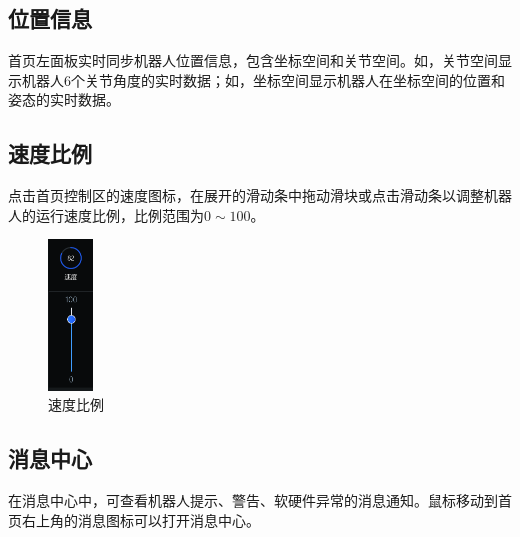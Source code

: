 
\subsection{位置信息}
\LM 首页左面板实时同步机器人位置信息，包含坐标空间和关节空间。如，关节空间显示机器人6个关节角度的实时数据；如，坐标空间显示机器人在坐标空间的位置和姿态的实时数据。

\subsection{速度比例}
点击\LM 首页控制区的速度图标，在展开的滑动条中拖动滑块或点击滑动条以调整机器人的运行速度比例，比例范围为$0\sim 100$。

\begin{figure}[ht]
	\centering
	\includegraphics[height=4cm]{screen/2-13.png}
	\caption{速度比例}
	\label{fig:速度比例}
\end{figure}

\subsection{消息中心}
在消息中心中，可查看机器人提示、警告、软硬件异常的消息通知。鼠标移动到\LM 首页右上角的消息图标\colorbox{black}{}可以打开消息中心。

